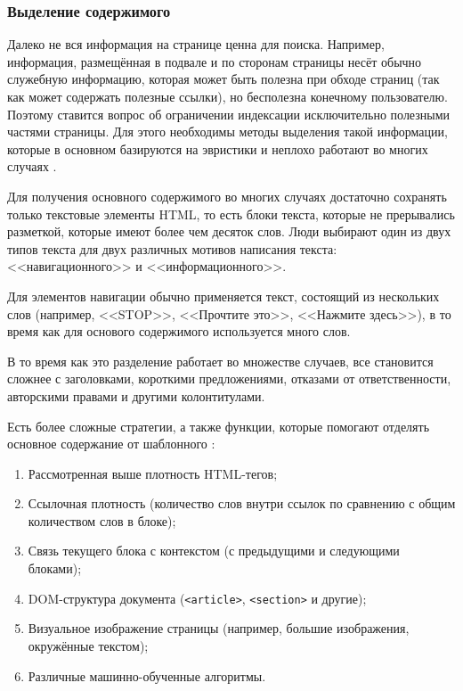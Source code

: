 \subsubsection{Выделение содержимого} \label{sssec:readability}
Далеко не вся информация на странице ценна для поиска. Например, информация, размещённая в подвале и по сторонам страницы несёт обычно служебную информацию, которая может быть полезна при обходе страниц (так как может содержать полезные ссылки), но бесполезна конечному пользователю. Поэтому ставится вопрос об ограничении индексации исключительно полезными частями страницы. Для этого необходимы методы выделения такой информации, которые в основном базируются на эвристики и неплохо работают во многих случаях \cite{pomikalek11}.

Для получения основного содержимого во многих случаях достаточно сохранять только текстовые элементы HTML, то есть блоки текста, которые не прерывались разметкой, которые имеют более чем десяток слов. Люди выбирают один из двух типов текста для двух различных мотивов написания текста: <<навигационного>> и <<информационного>>.

Для элементов навигации обычно применяется текст, состоящий из нескольких слов (например, <<STOP>>, <<Прочтите это>>, <<Нажмите здесь>>), в то время как для основого содержимого используется много слов.

В то время как это разделение работает во множестве случаев, все становится сложнее с заголовками, короткими предложениями, отказами от ответственности, авторскими правами и другими колонтитулами.

Есть более сложные стратегии, а также функции, которые помогают отделять основное содержание от шаблонного \cite{kohlschutter10}:
\begin{enumerate}
  \item Рассмотренная выше плотность HTML-тегов;
  \item Ссылочная плотность (количество слов внутри ссылок по сравнению с общим количеством слов в блоке);
  \item Связь текущего блока с контекстом (с предыдущими и следующими блоками);
  \item DOM-структура документа (\verb|<article>|, \verb|<section>| и другие);
  \item Визуальное изображение страницы (например, большие изображения, окружённые текстом);
  \item Различные машинно-обученные алгоритмы.
\end{enumerate}

